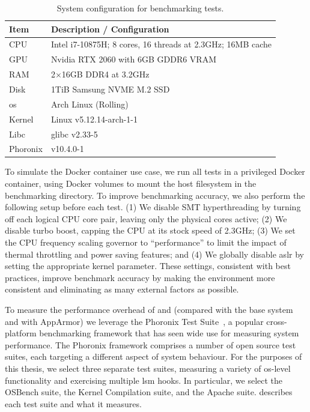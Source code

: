 \begin{table}[htpb]
  \centering
  \caption[System configuration for benchmarking tests]{System configuration for benchmarking tests.}%
  \label{tab:system-config}
  \begin{tabular}{ll}
  \toprule
  Item & Description / Configuration \\
  \midrule
  CPU & Intel i7-10875H; 8 cores, 16 threads at 2.3GHz; 16MB cache\\
  GPU & Nvidia RTX 2060 with 6GB GDDR6 VRAM \\
  RAM & 2$\times$16GB DDR4 at 3.2GHz \\
  Disk & 1TiB Samsung NVME M.2 SSD \\
  \midrule
  \gls{os} & Arch Linux (Rolling) \\
  Kernel & Linux v5.12.14-arch-1-1 \\
  Libc & glibc v2.33-5 \\
  Phoronix & v10.4.0-1 \\
  \bottomrule
  \end{tabular}
\end{table}

To simulate the Docker container use case, we run all tests in a privileged Docker
container, using Docker volumes to mount the host filesystem in the benchmarking
directory. To improve benchmarking accuracy, we also perform the following setup before
each test. (1) We disable SMT hyperthreading by turning off each logical CPU core pair,
leaving only the physical cores active; (2) We disable turbo boost, capping the CPU at its
stock speed of 2.3GHz; (3) We set the CPU frequency scaling governor to
\enquote{performance} to limit the impact of thermal throttling and power saving features;
and (4) We globally disable \gls{aslr} by setting the appropriate kernel parameter. These
settings, consistent with best practices, improve benchmark accuracy by making the
environment more consistent and eliminating as many external factors as possible.

To measure the performance overhead of \bpfbox{} and \bpfcontain{} (compared with the base
system and with AppArmor) we leverage the Phoronix Test Suite~\cite{phoronix}, a popular
cross-platform benchmarking framework that has seen wide use for measuring system
performance. The Phoronix framework comprises a number of open source test suites, each
targeting a different aspect of system behaviour. For the purposes of this thesis, we
select three separate test suites, measuring a variety of \gls{os}-level functionality and
exercising multiple \gls{lsm} hooks. In particular, we select the OSBench suite, the
Kernel Compilation suite, and the Apache suite.  describes each test
suite and what it measures.


